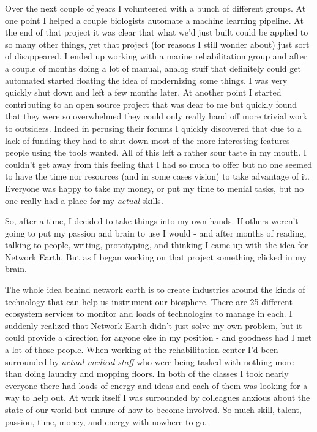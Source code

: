 \documentclass[11pt]{book}
\begin{document}
Over the next couple of years I volunteered with a bunch of different groups. At one point I helped a couple biologists automate a machine learning pipeline. At the end of that project it was clear that what we'd just built could be applied to so many other things, yet that project (for reasons I still wonder about) just sort of disappeared. I ended up working with a marine rehabilitation group and after a couple of months doing a lot of manual, analog stuff that definitely could get automated started floating the idea of modernizing some things. I was very quickly shut down and left a few months later. At another point I started contributing to an open source project that was dear to me but quickly found that they were so overwhelmed they could only really hand off  more trivial work to outsiders. Indeed in perusing their forums I quickly discovered that due to a lack of funding they had to shut down most of the more interesting features people using the tools wanted. All of this left a rather sour taste in my mouth. I couldn't get away from this feeling that I had so much to offer but no one seemed to have the time nor resources (and in some cases vision) to take advantage of it. Everyone was happy to take my money, or put my time to menial tasks, but no one really had a place for my \textit{actual} skills.
\newline

So, after a time, I decided to take things into my own hands. If others weren't going to put my passion and brain to use I would - and after months of reading, talking to people, writing, prototyping, and thinking I came up with the idea for Network Earth. But as I began working on that project something clicked in my brain. 
\newline

The whole idea behind network earth is to create industries around the kinds of technology that can help us instrument our biosphere. There are 25 different ecosystem services to monitor and loads of technologies to manage in each. I suddenly realized that Network Earth didn't just solve my own problem, but it could provide a direction for anyone else in my position - and goodness had I met a lot of those people. When working at the rehabilitation center I'd been surrounded by \textit{actual medical staff} who were being tasked with nothing more than doing laundry and mopping floors. In both of the classes I took nearly everyone there had loads of energy and ideas and each of them was looking for a way to help out. At work itself I was surrounded by colleagues anxious about the state of our world but unsure of how to become involved. So much skill, talent, passion, time, money, and energy with nowhere to go. 
\newline
\end{document}
